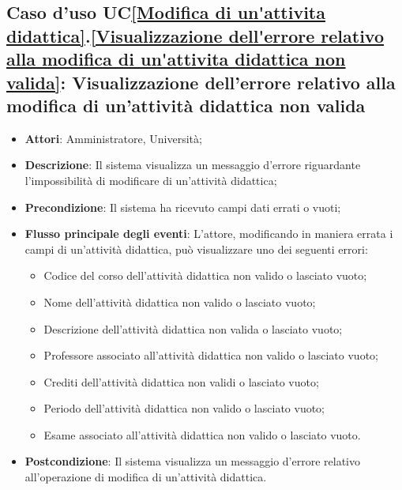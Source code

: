 \subsection{Caso d'uso UC\ref{Modifica di un'attivita didattica}.\ref{Visualizzazione dell'errore relativo alla modifica di un'attivita didattica non valida}: Visualizzazione dell'errore relativo alla modifica di un'attività didattica non valida}
\begin{itemize}
	\item \textbf{Attori}: Amministratore, Università;
	\item \textbf{Descrizione}: Il sistema visualizza un messaggio d'errore riguardante l'impossibilità di modificare di un'attività didattica;
	
	\item \textbf{Precondizione}: Il sistema ha ricevuto campi dati errati o vuoti;
	
	\item \textbf{Flusso principale degli eventi}: L'attore, modificando in maniera errata i campi di un'attività didattica, può visualizzare uno dei seguenti errori: 
	\begin{itemize} 
		\item Codice del corso dell'attività didattica non valido o lasciato vuoto; 
		\item Nome dell'attività didattica non valido o lasciato vuoto;
		\item Descrizione dell'attività didattica non valida o lasciato vuoto; 
		\item Professore associato all'attività didattica non valido o lasciato vuoto;
		\item Crediti dell'attività didattica non validi o lasciato vuoto; 
		\item Periodo dell'attività didattica non valido o lasciato vuoto; 
		\item Esame associato all'attività didattica non valido o lasciato vuoto. 
	\end{itemize}
	\item \textbf{Postcondizione}: Il sistema visualizza un messaggio d'errore relativo all'operazione di modifica di un'attività didattica.
	
	
\end{itemize}





